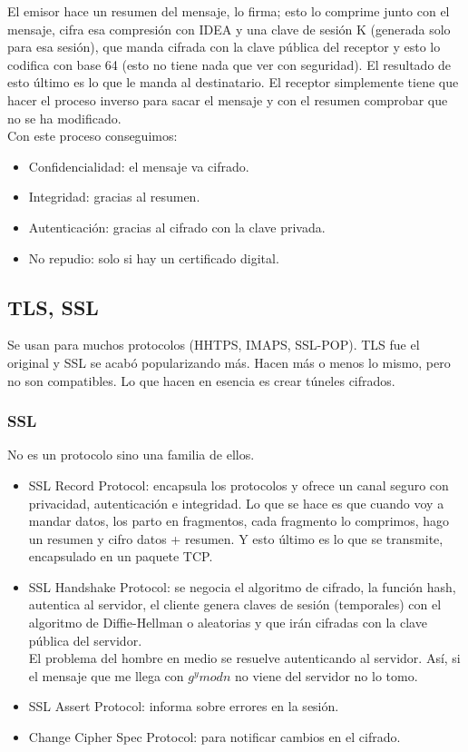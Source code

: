 El emisor hace un resumen del mensaje, lo firma; esto lo comprime junto con el mensaje, cifra esa compresión con IDEA y una clave de sesión K (generada solo para esa sesión), que manda cifrada con la clave pública del receptor y esto lo codifica con base 64 (esto no tiene nada que ver con seguridad). El resultado de esto último es lo que le manda al destinatario. El receptor simplemente tiene que hacer el proceso inverso para sacar el mensaje y con el resumen comprobar que no se ha modificado.\\

Con este proceso conseguimos:
\begin{itemize}
    \item Confidencialidad: el mensaje va cifrado.
    \item Integridad: gracias al resumen.
    \item Autenticación: gracias al cifrado con la clave privada.
    \item No repudio: solo si hay un certificado digital.
\end{itemize}


\subsection{TLS\@, SSL}
Se usan para muchos protocolos (HHTPS\@, IMAPS\@, SSL\@-POP\@). TLS fue el original y SSL se acabó popularizando más. Hacen más o menos lo mismo, pero no son compatibles. Lo que hacen en esencia es crear túneles cifrados. 

\subsubsection{SSL}
No es un protocolo sino una familia de ellos.
\begin{itemize}
    \item SSL Record Protocol: encapsula los protocolos y ofrece un canal seguro con privacidad, autenticación e integridad. Lo que se hace es que cuando voy a mandar datos, los parto en fragmentos, cada fragmento lo comprimos, hago un resumen y cifro datos + resumen. Y esto último es lo que se transmite, encapsulado en un paquete TCP\@.
    \item SSL Handshake Protocol: se negocia el algoritmo de cifrado, la función hash, autentica al servidor, el cliente genera claves de sesión (temporales) con el algoritmo de Diffie-Hellman o aleatorias y que irán cifradas con la clave pública del servidor. \\
        El problema del hombre en medio se resuelve autenticando al servidor. Así, si el mensaje que me llega con $g^ymodn$ no viene del servidor no lo tomo. 
    \item SSL Assert Protocol: informa sobre errores en la sesión.
    \item Change Cipher Spec Protocol: para notificar cambios en el cifrado.
\end{itemize}

